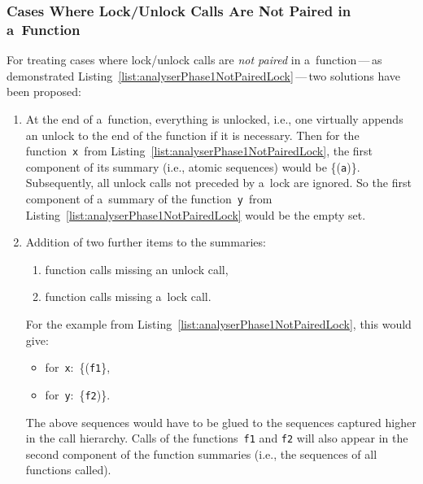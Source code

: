 \newpage
\subsubsection{Cases Where Lock/Unlock Calls Are Not Paired in a~Function}

For treating cases where lock/unlock calls are \emph{not paired} in
a~function\,---\,as demonstrated
Listing~\ref{list:analyserPhase1NotPairedLock}\,---\,two solutions
have been proposed:
\begin{enumerate}
    \item
        At the end of a~function, everything is unlocked, i.e., one
        virtually appends an unlock to the end of the function if it 
        is necessary. Then for the function~\texttt{x}~from
        Listing~\ref{list:analyserPhase1NotPairedLock}, the first component
        of its summary (i.e., atomic sequences) would be \{(\texttt{a})\}.
        Subsequently, all unlock calls not preceded by a~lock are
        ignored. So the first component of a~summary of the
        function~\texttt{y}~from
        Listing~\ref{list:analyserPhase1NotPairedLock} would be the empty 
        set.

    \item
        Addition of two further items to the summaries:
        \begin{enumerate}[label={(\alph*)}]
            \item
                function calls missing an unlock call,

            \item
                function calls missing a~lock call.
        \end{enumerate}
        For the example from Listing~\ref{list:analyserPhase1NotPairedLock},
        this would give:
        \begin{itemize}
            \item
                for~\texttt{x}:~\{(\texttt{f1}\},

            \item
                for~\texttt{y}:~\{\texttt{f2})\}.
        \end{itemize}
        The above sequences would have to be glued to the sequences
        captured higher in the call hierarchy. Calls of the
        functions~\texttt{f1} and \texttt{f2} will also appear in
        the second component of the function summaries (i.e., the sequences
        of all functions called).
\end{enumerate}

